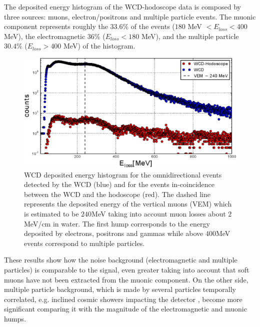 \documentclass[letterpaper,11pt]{article}
\begin{document}
The deposited energy histogram of the WCD-hodoscope data is composed by three sources: muons, electron/positrons and multiple particle events. The muonic component represents roughly the 33.6$\%$ of the events ($180$ MeV $< E_{loss} < 400$ MeV), the electromagnetic $36$\% ($E_{loss} < 180$ MeV), and the multiple particle $30.4\%$ ($E_{loss} > 400$ MeV) of the histogram. 

\begin{figure}[htb]
\centering
\includegraphics[width=0.7\columnwidth]{Figures/WCDHod.eps}
\caption{WCD deposited energy histogram for the omnidirectional events detected by the WCD (blue) and for the events in-coincidence between the WCD and the hodoscope (red). The dashed line represents the deposited energy of the vertical muons (VEM) which is estimated to be $240$MeV taking into account muon losses about $2$MeV/cm in water. The first hump corresponds to the energy deposited by electrons, positrons and gammas while above $400$MeV events correspond to multiple particles.}
\label{fig:WCDHod_rate}
\end{figure}

These results show how the noise background (electromagnetic and multiple particles) is comparable to the signal, even greater taking into account that soft muons have not been extracted from the muonic component. On the other side, multiple particle background, which is made by several particles temporally correlated, e.g. inclined cosmic showers impacting the detector \cite{Bonechi2019}, become more significant comparing it with the magnitude of the electromagnetic and muonic humps.
\end{document}
